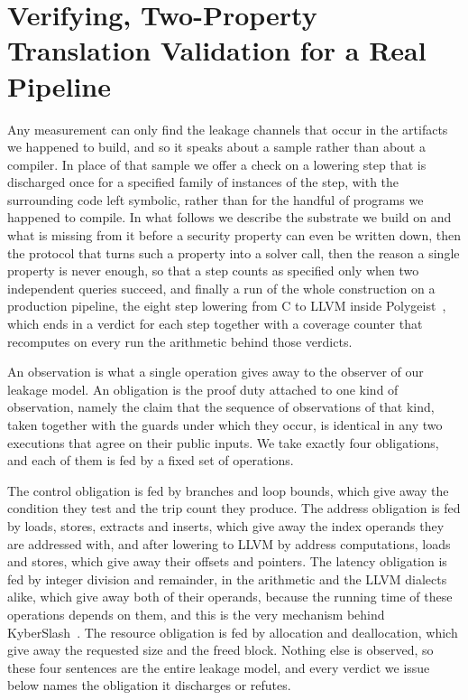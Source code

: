 \section{Verifying, Two-Property Translation Validation for a Real Pipeline}
\label{sec:verify}
Any measurement can only find the leakage channels that occur in the artifacts we happened to build, and so it speaks about a sample rather than about a compiler.
In place of that sample we offer a check on a lowering step that is discharged once for a specified family of instances of the step, with the surrounding code left symbolic, rather than for the handful of programs we happened to compile.
In what follows we describe the substrate we build on and what is missing from it before a security property can even be written down, then the protocol that turns such a property into a solver call, then the reason a single property is never enough, so that a step counts as specified only when two independent queries succeed, and finally a run of the whole construction on a production pipeline, the eight step lowering from C to LLVM inside Polygeist~\cite{moses2021polygeist}, which ends in a verdict for each step together with a coverage counter that recomputes on every run the arithmetic behind those verdicts.

An observation is what a single operation gives away to the observer of our leakage model.
An obligation is the proof duty attached to one kind of observation, namely the claim that the sequence of observations of that kind, taken together with the guards under which they occur, is identical in any two executions that agree on their public inputs.
We take exactly four obligations, and each of them is fed by a fixed set of operations.

The control obligation is fed by branches and loop bounds, which give away the condition they test and the trip count they produce.
The address obligation is fed by loads, stores, extracts and inserts, which give away the index operands they are addressed with, and after lowering to LLVM by address computations, loads and stores, which give away their offsets and pointers.
The latency obligation is fed by integer division and remainder, in the arithmetic and the LLVM dialects alike, which give away both of their operands, because the running time of these operations depends on them, and this is the very mechanism behind KyberSlash~\cite{kyberslash2024}.
The resource obligation is fed by allocation and deallocation, which give away the requested size and the freed block.
Nothing else is observed, so these four sentences are the entire leakage model, and every verdict we issue below names the obligation it discharges or refutes.

